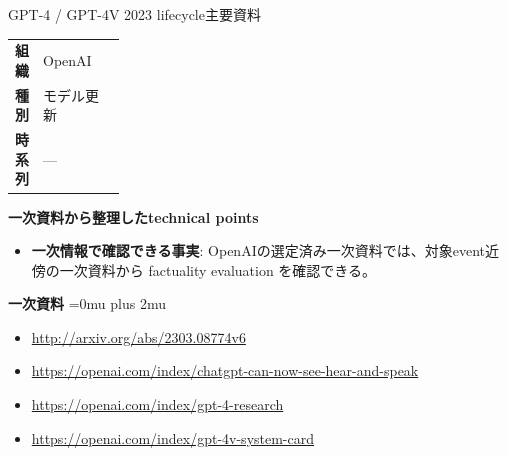 \begin{technicalnote}{GPT-4 / GPT-4V 2023 lifecycle}{主要資料}
\begingroup
\begin{tabularx}{\linewidth}{@{}>{\bfseries}p{0.22\linewidth}X@{}}
組織 & OpenAI \\
種別 & モデル更新 \\
時系列 & — \\
\end{tabularx}
\smallskip
{\bfseries 一次資料から整理したtechnical points}
\begin{itemize}[leftmargin=1.5em,itemsep=0.35em]
\item \textbf{一次情報で確認できる事実}: OpenAIの選定済み一次資料では、対象event近傍の一次資料から factuality evaluation を確認できる。
\end{itemize}
\begin{minipage}{\linewidth}
\begin{samepage}
{\bfseries 一次資料}
\begingroup\sloppy
\Urlmuskip=0mu plus 2mu\relax
\begin{itemize}[leftmargin=1.5em,itemsep=0.25em]
\item {\scriptsize\url{http://arxiv.org/abs/2303.08774v6}}
\item {\scriptsize\url{https://openai.com/index/chatgpt-can-now-see-hear-and-speak}}
\item {\scriptsize\url{https://openai.com/index/gpt-4-research}}
\item {\scriptsize\url{https://openai.com/index/gpt-4v-system-card}}
\end{itemize}
\endgroup
\end{samepage}
\end{minipage}
\endgroup
\end{technicalnote}
\medskip

